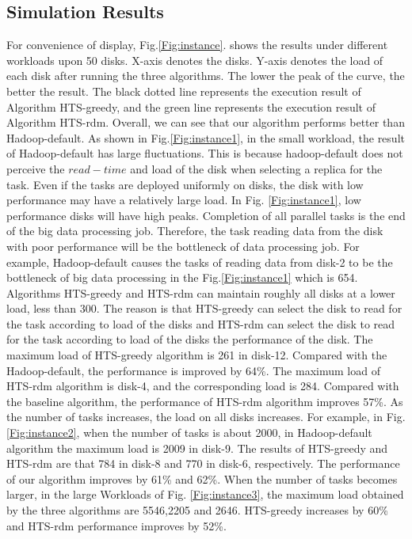 \documentclass[conference]{IEEEtran}
\begin{document}
\subsection{Simulation Results}

For convenience of display, Fig.\ref{Fig:instance}. shows the results under different workloads upon 50 disks. X-axis denotes the disks. Y-axis denotes the load of each disk after running the three algorithms. The lower the peak of the curve, the better the result. The black dotted line represents the execution result of Algorithm HTS-greedy, and the green line represents the execution result of Algorithm HTS-rdm. Overall, we can see that our algorithm performs better than Hadoop-default. As shown in Fig.\ref{Fig:instance1}, in the small workload, the result of Hadoop-default has large fluctuations. This is because hadoop-default does not perceive the $read-time$ and load of the disk when selecting a replica for the task. Even if the tasks are deployed uniformly on disks, the disk with low performance may have a relatively large load. In Fig. \ref{Fig:instance1}, low performance disks will have high peaks. Completion of all parallel tasks is the end of the big data processing job. Therefore, the task reading data from the disk with poor performance will be the bottleneck of data processing job. For example, Hadoop-default causes the tasks of reading data from disk-2 to be the bottleneck of big data processing in the Fig.\ref{Fig:instance1} which is 654. Algorithms HTS-greedy and HTS-rdm can maintain roughly all disks at a lower load, less than 300. The reason is that HTS-greedy can select the disk to read for the task according to load of the disks and HTS-rdm can select the disk to read for the task according to load of the disks the performance of the disk. The maximum load of HTS-greedy algorithm is 261 in disk-12. Compared with the Hadoop-default, the performance is improved by 64\%. The maximum load of HTS-rdm algorithm is disk-4, and the corresponding load is 284. Compared with the baseline algorithm, the performance of HTS-rdm algorithm improves 57\%.
As the number of tasks increases, the load on all disks increases. For example, in Fig.\ref{Fig:instance2}, when the number of tasks is about 2000, in Hadoop-default algorithm the maximum load is 2009 in disk-9. The results of HTS-greedy and HTS-rdm are that 784 in disk-8  and 770 in disk-6, respectively. The performance of our algorithm improves by 61\% and 62\%. 
When the number of tasks becomes larger, in the large Workloads of Fig. \ref{Fig:instance3}, the maximum load obtained by the three algorithms are 5546,2205 and 2646. HTS-greedy increases by 60\% and HTS-rdm performance improves by 52\%.
 
\end{document}
